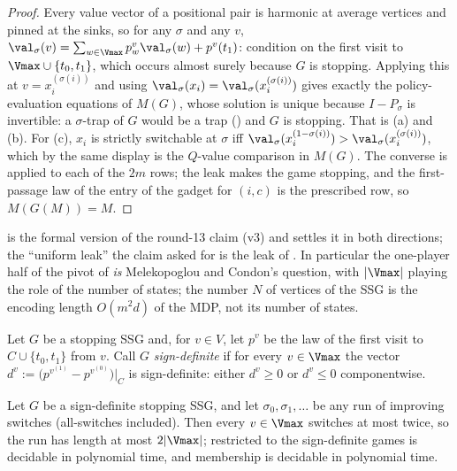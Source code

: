\begin{proof}
Every value vector of a positional pair is harmonic at average vertices and pinned at
the sinks, so for any $\sigma$ and any $v$, $\val_\sigma(v)=\sum_{w\in\Vmax}
p^{v}_w\val_\sigma(w)+p^{v}(t_1)$: condition on the first visit to
$\Vmax\cup\{t_0,t_1\}$, which occurs almost surely because $G$ is stopping. Applying
this at $v=x_i^{(\sigma(i))}$ and using $\val_\sigma(x_i)=\val_\sigma(x_i^{(\sigma(i))})$
gives exactly the policy-evaluation equations of $M(G)$, whose solution is unique
because $I-P_\sigma$ is invertible: a $\sigma$-trap of $G$ would be a trap
() and $G$ is stopping. That is (a) and (b). For (c), $x_i$ is
strictly switchable at $\sigma$ iff
$\val_\sigma(x_i^{(1-\sigma(i))})>\val_\sigma(x_i^{(\sigma(i))})$, which by the same
display is the $Q$-value comparison in $M(G)$. The converse is
 applied to each of the $2m$ rows; the leak makes the game
stopping, and the first-passage law of the entry of the gadget for $(i,c)$ is the
prescribed row, so $M(G(M))=M$.
\end{proof}

\begin{remark}\label{oph:v3}
 is the formal version of the round-13 claim (v3) and settles it
in both directions; the ``uniform leak'' the claim asked for is the leak of
. In particular the one-player half of the pivot of
 \emph{is} Melekopoglou and Condon's question, with $|\Vmax|$
playing the role of the number of states; the number $N$ of vertices of the SSG is
the encoding length $O(m^{2}d)$ of the MDP, not its number of states.
\end{remark}

\begin{definition}\label{oph:def-signdef}
Let $G$ be a stopping SSG and, for $v\in V$, let $p^{v}$ be the law of the first visit
to $C\cup\{t_0,t_1\}$ from $v$. Call $G$ \emph{sign-definite} if for every
$v\in\Vmax$ the vector $d^{v}:=\bigl(p^{v^{(1)}}-p^{v^{(0)}}\bigr)\big|_{C}$ is
sign-definite: either $d^{v}\ge0$ or $d^{v}\le0$ componentwise.
\end{definition}

\begin{theorem}\label{oph:signdef}
Let $G$ be a sign-definite stopping SSG, and let $\sigma_0,\sigma_1,\dots$ be any run
of improving switches (all-switches included). Then every $v\in\Vmax$ switches at most
twice, so the run has length at most $2|\Vmax|$;  restricted to the
sign-definite games is decidable in polynomial time, and membership is decidable in
polynomial time.
\end{theorem}

